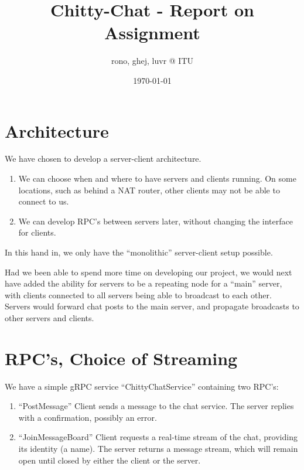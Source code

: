 \documentclass[a4paper,11pt]{article}
\title{Chitty-Chat - Report on Assignment}
\author{rono, ghej, luvr @ ITU}
\date{\today}
\begin{document}
\maketitle

\tableofcontents

\pagebreak

\section{Architecture}

We have chosen to develop a server-client architecture. 

\begin{enumerate}
    \item We can choose when and where to have servers and clients running. On some locations, such as behind a NAT router, other clients may not be able to connect to us. 
    \item We can develop RPC's between servers later, without changing the interface for clients. 
\end{enumerate}

In this hand in, we only have the ``monolithic'' server-client setup possible. 

\bigbreak

Had we been able to spend more time on developing our project, we would next have added the ability for servers to be a repeating node for a ``main'' server, with clients connected to all servers being able to broadcast to each other. Servers would forward chat posts to the main server, and propagate broadcasts to other servers and clients. 

\section{RPC's, Choice of Streaming}
We have a simple gRPC service ``ChittyChatService'' containing two RPC's:

\begin{enumerate}
    \item ``PostMessage'' Client sends a message to the chat service. The server replies with a confirmation, possibly an error. 
    \item ``JoinMessageBoard'' Client requests a real-time stream of the chat, providing its identity (a name). The server returns a message stream, which will remain open until closed by either the client or the server. 
\end{enumerate}
\end{document}
